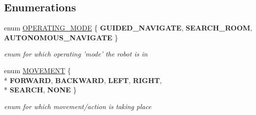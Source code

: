 \subsection*{Enumerations}
\begin{DoxyCompactItemize}
\item 
enum \hyperlink{robotcode_8ino_a980e950615d86dadef54f3cfaefb5fb4}{O\+P\+E\+R\+A\+T\+I\+N\+G\+\_\+\+M\+O\+D\+E} \{ {\bfseries G\+U\+I\+D\+E\+D\+\_\+\+N\+A\+V\+I\+G\+A\+T\+E}, 
{\bfseries S\+E\+A\+R\+C\+H\+\_\+\+R\+O\+O\+M}, 
{\bfseries A\+U\+T\+O\+N\+O\+M\+O\+U\+S\+\_\+\+N\+A\+V\+I\+G\+A\+T\+E}
 \}
\begin{DoxyCompactList}\small\item\em enum for which operating 'mode' the robot is in \end{DoxyCompactList}\item 
enum \hyperlink{robotcode_8ino_adc716dd21485bffb9015eaeb3cfe6859}{M\+O\+V\+E\+M\+E\+N\+T} \{ \\*
{\bfseries F\+O\+R\+W\+A\+R\+D}, 
{\bfseries B\+A\+C\+K\+W\+A\+R\+D}, 
{\bfseries L\+E\+F\+T}, 
{\bfseries R\+I\+G\+H\+T}, 
\\*
{\bfseries S\+E\+A\+R\+C\+H}, 
{\bfseries N\+O\+N\+E}
 \}
\begin{DoxyCompactList}\small\item\em enum for which movement/action is taking place \end{DoxyCompactList}\end{DoxyCompactItemize}
